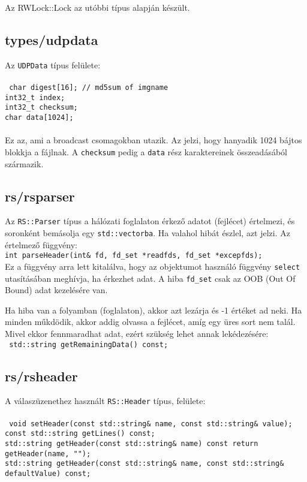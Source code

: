 \documentclass[fleqn,10pt,a4paper,titlepage]{article}
\begin{document}
  Az RWLock::Lock az utóbbi típus alapján készült.

  \subsection{types/udpdata}
  Az \texttt{UDPData} típus felülete:\\\\
  \texttt{
    char digest[16]; // md5sum of imgname\\
    int32\_t index;\\
    int32\_t checksum;\\
    char data[1024];\\\\
  }
  Ez az, ami a broadcast csomagokban utazik. Az  jelzi, hogy hanyadik 1024 bájtos blokkja a fájlnak. A
  \texttt{checksum} pedig a \texttt{data} rész karaktereinek összeadásából származik.
  
  \subsection{rs/rsparser}
  Az \texttt{RS::Parser} típus a hálózati foglalaton érkező adatot (fejlécet) értelmezi, és soronként bemásolja egy
  \texttt{std::vectorba}. Ha valahol hibát észlel, azt jelzi. Az értelmező függvény:\\

  \texttt{int parseHeader(int\& fd, fd\_set *readfds, fd\_set *excepfds);}\\
  
  Ez a függvény arra lett kitalálva, hogy az objektumot használó függvény \texttt{select} utasításában meghívja, ha
  érkezhet adat. A hiba \texttt{fd\_set} csak az OOB (Out Of Bound) adat kezelésére van.
  
  Ha hiba van a folyamban (foglalaton), akkor azt lezárja és -1 értéket ad neki. Ha minden műkdödik, akkor addig olvassa
  a fejlécet, amíg egy üres sort nem talál. Mivel ekkor fennmaradhat adat, ezért szükség lehet annak lekédezésére:\\
  \texttt{ std::string getRemainingData() const;}

  \subsection{rs/rsheader}
  A válaszüzenethez használt \texttt{RS::Header} típus, felülete:\\\\
  \texttt{
  void setHeader(const std::string\& name, const std::string\& value);\\
  const std::string getLines() const;\\
  std::string getHeader(const std::string\& name) const {return getHeader(name, ""); }\\
  std::string getHeader(const std::string\& name, const std::string\& defaultValue) const;\\
  }
  
\end{document}
